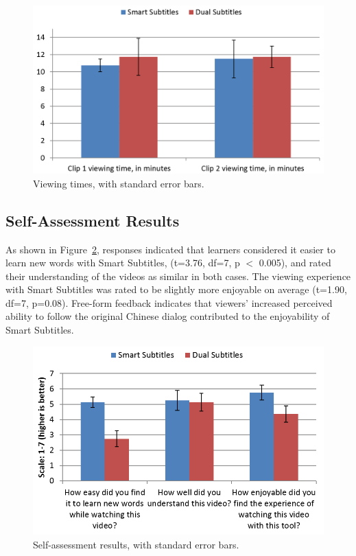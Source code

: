 \documentclass{sigchi}
\begin{document}
\begin{figure}[!h]
\centering
\includegraphics[width=\columnwidth]{viewing-times}
\caption{Viewing times, with standard error bars.}
\label{fig:figure7}
\end{figure}

\pagebreak

\subsection{Self-Assessment Results}

As shown in Figure~\ref{fig:figure8}, responses indicated that learners considered it easier to learn new words with Smart Subtitles, (t=3.76, df=7, p $<$ 0.005), and rated their understanding of the videos as similar in both cases. The viewing experience with Smart Subtitles was rated to be slightly more enjoyable on average (t=1.90, df=7, p=0.08). Free-form feedback indicates that viewers' increased perceived ability to follow the original Chinese dialog contributed to the enjoyability of Smart Subtitles.


\begin{figure}[!h]
\centering
\includegraphics[width=\columnwidth]{self-assessment-results}
\caption{Self-assessment results, with standard error bars.}
\label{fig:figure8}
\end{figure}
\end{document}
